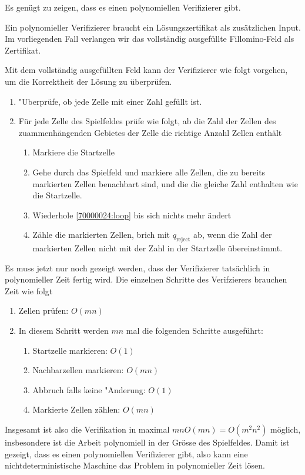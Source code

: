 \begin{loesung}
Es genügt zu zeigen, dass es einen polynomiellen Verifizierer gibt.

Ein polynomieller Verifizierer braucht ein Lösungszertifikat als 
zusätzlichen Input. Im vorliegenden Fall verlangen wir das vollständig
ausgefüllte Fillomino-Feld als Zertifikat.

Mit dem vollständig ausgefüllten Feld kann der Verifizierer wie folgt
vorgehen, um die Korrektheit der Lösung zu überprüfen.
\begin{enumerate}
\item "Uberprüfe, ob jede Zelle mit einer Zahl gefüllt ist.
\item Für jede Zelle des Spielfeldes prüfe wie folgt, ab die Zahl der
Zellen des zuammenhängenden Gebietes der Zelle die richtige Anzahl
Zellen enthält
\begin{enumerate}
\item Markiere die Startzelle
\item \label{70000024:loop} Gehe durch das Spielfeld und markiere alle Zellen, die zu bereits
markierten Zellen benachbart sind, und die die gleiche Zahl enthalten wie
die Startzelle.
\item Wiederhole \ref{70000024:loop} bis sich nichts mehr ändert
\item Zähle die markierten Zellen, brich mit $q_{\text{reject}}$ ab,
wenn die Zahl der markierten Zellen nicht mit der Zahl in der Startzelle
übereinstimmt.
\end{enumerate}
\end{enumerate}
Es muss jetzt nur noch gezeigt werden, dass der Verifizierer tatsächlich
in polynomieller Zeit fertig wird. Die einzelnen Schritte des Verifzierers
brauchen Zeit wie folgt
\begin{enumerate}
\item Zellen prüfen: $O(mn)$
\item In diesem Schritt werden $mn$ mal die folgenden Schritte ausgeführt:
\begin{enumerate}
\item Startzelle markieren: $O(1)$
\item Nachbarzellen markieren: $O(mn)$
\item Abbruch falls keine "Anderung: $O(1)$
\item Markierte Zellen zählen: $O(mn)$
\end{enumerate}
\end{enumerate}
Insgesamt ist also die Verifikation in maximal $mnO(mn)=O(m^2n^2)$ möglich,
insbesondere ist die Arbeit polynomiell in der Grösse des Spielfeldes.
Damit ist gezeigt, dass es einen polynomiellen Verifizierer gibt,
also kann eine nichtdeterministische Maschine das Problem in polynomieller
Zeit lösen.
\end{loesung}

